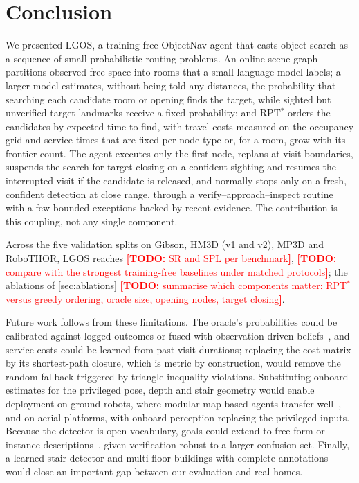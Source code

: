 \documentclass[10pt]{article}
\newcommand{\TODO}[1]{\textcolor{red}{\textbf{[TODO:} #1\textbf{]}}}
\newcommand{\ours}{LGOS\xspace}
\begin{document}
\section{Conclusion}\label{sec:conclusion}

We presented \ours, a training-free ObjectNav agent that casts object search as a sequence of small probabilistic
routing problems. An online scene graph partitions observed free space into rooms that a small language model labels;
a larger model estimates, without being told any distances, the probability that searching each candidate room or
opening finds the target, while sighted but unverified target landmarks receive a fixed probability; and RPT$^*$ orders
the candidates by expected time-to-find, with travel costs measured on the occupancy grid and service times that are
fixed per node type or, for a room, grow with its frontier count. The
agent executes only the first node, replans at visit boundaries, suspends the search for target closing on a
confident sighting and resumes the interrupted visit if the candidate is released, and normally stops only on a fresh,
confident detection at close range, through a verify--approach--inspect routine with a few bounded exceptions backed
by recent evidence. The contribution is this
coupling, not any single component.

Across the five validation splits on Gibson, HM3D (v1 and v2), MP3D and RoboTHOR, \ours reaches \TODO{SR and SPL
per benchmark}, \TODO{compare with the strongest training-free baselines under matched protocols}; the ablations of \cref{sec:ablations} \TODO{summarise which
components matter: RPT$^*$ versus greedy ordering, oracle size, opening nodes, target closing}.

Future work follows from these limitations. The oracle's probabilities could be calibrated against logged outcomes or
fused with observation-driven beliefs~\citep{zhou2025beliefmapnav}, and service costs could be learned from past visit
durations; replacing the cost matrix by its shortest-path closure, which is metric by construction, would remove the
random fallback triggered by triangle-inequality violations. Substituting onboard estimates for the privileged pose,
depth and stair geometry would enable deployment on ground robots,
where modular map-based agents transfer well~\citep{gervet2023navigating}, and on aerial platforms, with onboard
perception replacing the privileged inputs.
Because the detector is open-vocabulary, goals could extend to free-form or instance descriptions~\citep{yin2025unigoal},
given verification robust to a larger confusion set. Finally, a learned stair detector and multi-floor buildings with
complete annotations would close an important gap between our evaluation and real homes.
\end{document}
